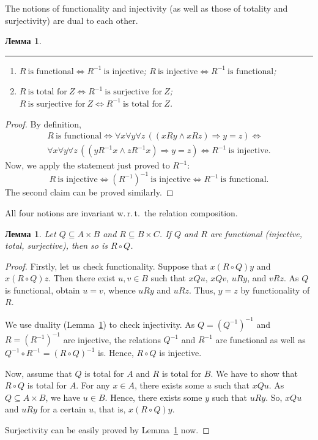 \documentclass[12pt,notitlepage]{article}
\theoremstyle{plain}
\newtheorem{lemma}[thm]{Лемма}
\theoremstyle{definition}
\theoremstyle{plain}
\newcommand{\sbs}{\subseteq}
\newcommand{\1}{\mathbf{1}}
\newcommand{\0}{\mathbf{0}}
\newcommand{\ply}{\Longrightarrow}
\begin{document}
The notions of functionality and injectivity (as well as those of totality and surjectivity) are dual to each other.
\begin{lemma}\label{ch0:fnc_inv}\rule{1pt}{0pt}
	\begin{enumerate}
		\item $R\ \mbox{is functional} \iff R^{-1}\ \mbox{is injective}$; $R\ \mbox{is injective} \iff R^{-1}\ \mbox{is functional}$;
		\item $R\ \mbox{is total for}\ Z \iff R^{-1}\ \mbox{is surjective for}\ Z$; $R\ \mbox{is surjective for}\ Z \iff R^{-1}\ \mbox{is total for}\ Z$.
	\end{enumerate}
\end{lemma}
\begin{proof}
	By definition,
	\begin{multline*}
		R\ \mbox{is functional} \iff \forall x \forall y \forall z\, ( (x R y \wedge x R z) \ply y = z ) \iff\\
		\forall x \forall y \forall z\, ( (y R^{-1} x \wedge z R^{-1} x) \ply y = z )  \iff R^{-1}\ \mbox{is injective}.
	\end{multline*}
	Now, we apply the statement just proved to $R^{-1}$:
	$$
	R\ \mbox{is injective} \iff (R^{-1})^{-1}\ \mbox{is injective} \iff R^{-1}\ \mbox{is functional}.
	$$
	The second claim can be proved similarly.
\end{proof}


\noindent All four notions are invariant w.\,r.\,t.\ the relation composition.
\begin{lemma}\label{ch0:fnc_cmp} Let $Q \sbs A \times B$ and $R \sbs B \times C$.  If $Q$ and $R$ are functional (injective, total, surjective), then so is $R \circ Q$.
\end{lemma}
\begin{proof}
	Firstly, let us check functionality. Suppose that $x(R \circ Q)y$ and $x(R \circ Q)z$. Then there exist $u,v\in B$ such that $xQu$, $xQv$, $u R y$, and $v R z$. As $Q$ is functional, obtain $u = v$, whence $u R y$ and $u R z$. Thus, $y = z$ by functionality of $R$.
	
	We use duality (Lemma~\ref{ch0:fnc_inv}) to check injectivity. As $Q = (Q^{-1})^{-1}$ and $R = (R^{-1})^{-1}$ are injective, the relations $Q^{-1}$ and $R^{-1}$ are functional as well as $Q^{-1} \circ R^{-1} = (R \circ Q)^{-1}$ is. Hence, $R \circ Q$ is injective.
	
	Now, assume that $Q$ is total for $A$ and $R$ is total for $B$. We have to show that $R \circ Q$ is total for $A$. For any $x \in A$, there exists some $u$ such that $x Q u$. As $Q \sbs A \times B$, we have $u \in B$. Hence, there exists some $y$ such that $u R y$. So, $x Q u$ and $u R y$ for a certain $u$, that is, $x(R \circ Q)y$.
	
	Surjectivity can be easily proved by Lemma~\ref{ch0:fnc_inv} now.
\end{proof}
\end{document}

